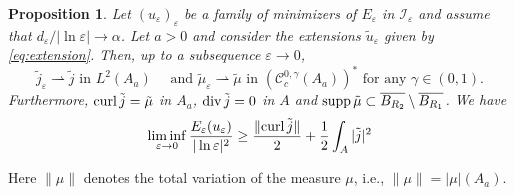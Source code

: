 \documentclass[12pt,reqno]{amsart}
\newtheorem{proposition}[theorem]{Proposition}
\def\C{{\mathcal C}}
\def\I{{\mathcal I}}
\def\e {{\varepsilon}}
\def\curl{{\rm curl\,}}
\def\supp{{\rm supp\,}}
\DeclareMathOperator \dive{\rm {div}}
\numberwithin{equation}{section}
\begin{document}
\begin{proposition}\label{prop:first_lower_bound}
Let \( (u_\e)_\e\) be a family of minimizers of \(E_\e\) in \(\I_\e\) and assume that \(d_\e/|\ln \e| \to \alpha\). Let \(a>0\) and consider the extensions \(\tilde{u}_\e\) given by \eqref{eq:extension}.
Then, up to a subsequence \(\e\to 0\),
\begin{equation*}
\tilde{j}_\e \rightharpoonup \tilde{j} \text{ in } L^2(A_a) \quad \text{ and }  \tilde{\mu}_\e \rightharpoonup \tilde{\mu} \text{ in } (\C_c^{0,\gamma}(A_a))^* \text{ for any } \gamma\in (0,1).
\end{equation*}
Furthermore, \(\curl \tilde{j}=\tilde{\mu}\) in \(A_a\), \(\dive \tilde{j}=0\) in \(A\) and \(\supp \tilde{\mu} \subset \overline{B_{R_2}}\setminus \overline{B_{R_1}}\). We have
\begin{equation}\label{eq:lower_bound00}
\liminf_{\e \to 0}\frac{E_\e (u_\e)}{|\ln \e|^2}\geq \frac{\|\curl \tilde{j}\|}{2}+\frac{1}{2}\int_{A} |\tilde{j}|^2
\end{equation}
\end{proposition}
Here \(\|\mu\|\) denotes the total variation of the measure \(\mu\), i.e., \(\|\mu\|=|\mu|(A_a)\).
\end{document}
